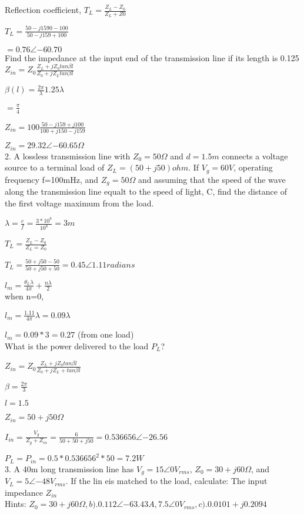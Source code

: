\documentclass[10pt,a4paper]{report}
\begin{document}
Reflection coefficient, $T_{L}=\frac{Z_{L}-Z_{0}}{Z_{L}+Z{0}}$

$T_{L}=\frac{50-j1590-100}{50-j159+100}$

$=0.76 \angle {-60.70}$\\
Find the impedance at the input end of the transmission line if its length is 0.125
$Z_{in}=Z_{0} \frac{Z_{L}+jZ_{0}tan\beta l}{Z_{0}+jZ_{L}tan\beta l}$

$\beta(l)=\frac{2\pi}{\lambda}1.25\lambda$

$=\frac{\pi}{4}$

$Z_{in}=100\frac{50-j159+j100}{100+j150-j159}$

$Z_{in}=29.32\angle{-60.65} \Omega$\\
2. A lossless transmission line with $Z_{0}=50 \Omega$ and $d=1.5m$ connects a voltage source to a terminal load of $Z_{L}=(50+j50) ohm$. If $V_{g}=60V$, operating frequency f=100mHz, and $Z_{g}=50\Omega$ and assuming that the speed of the wave along the transmission line equalt to the speed of light, C, find the distance of the first voltage maximum from the load.

$\lambda=\frac{c}{f}=\frac{3*10^8}{10^8}=3m$

$T_{L}=\frac{Z_{L}-Z_{0}}{Z_{L}=Z_{0}}$

$T_{L}=\frac{50+j50-50}{50+j50+50}=0.45\angle{1.11radians}$

$l_{m}=\frac{\theta_{L}\lambda}{4\pi}+\frac{n\lambda}{2}$\\
when n=0, 

$l_{m}=\frac{1.11}{4\pi}\lambda=0.09\lambda$

$l_{m}=0.09*3=0.27$ (from one load)\\
What is the power delivered to the load $P_{L}$?

$Z_{in}=Z_{0}\frac{Z_{L}+jZ_{0}tan\beta l}{Z_{0}+jZ_{L}+tan\beta l}$

$\beta=\frac{2\pi}{3}$

$l=1.5$

$Z_{in}=50+j50\Omega$

$I_{in}=\frac{V_{g}}{Z_{g}+Z_{in}}=\frac{6}{50+50+j50}=0.536656\angle{-26.56}$

$P_{L}=P_{in}=0.5*0.536656^2 * 50=7.2W$\\
3. A 40m long transmission line has $V_{g}=15\angle{0} V_{rms}$, $Z_{0}=30+j60 \Omega$, and $V_{L}=5\angle{-48} V_{rms}$. If the lin eis matched to the load, calculate: The input impedance $Z_{in}$\\
Hints: $Z_{0}=30+j60\Omega, b). 0.112\angle{-63.43} A, 7.5 \angle{0} V_{rms}, c). 0.0101+j0.2094$
\end{document}
